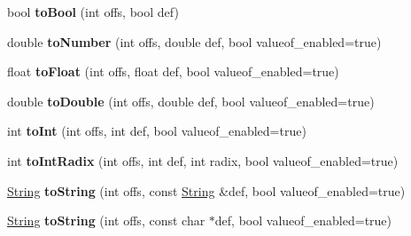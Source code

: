 \begin{DoxyCompactItemize}
\item 
bool {\bfseries to\+Bool} (int offs, bool def)\hypertarget{class_object_script_1_1_o_s_aebf8399e8f8802b67b8a27aca62fe905}{}\label{class_object_script_1_1_o_s_aebf8399e8f8802b67b8a27aca62fe905}

\item 
double {\bfseries to\+Number} (int offs, double def, bool valueof\+\_\+enabled=true)\hypertarget{class_object_script_1_1_o_s_abdc7b70c3bff83a69dbb933260be3419}{}\label{class_object_script_1_1_o_s_abdc7b70c3bff83a69dbb933260be3419}

\item 
float {\bfseries to\+Float} (int offs, float def, bool valueof\+\_\+enabled=true)\hypertarget{class_object_script_1_1_o_s_a5bd5708a0f57783edaffad0df7e1198b}{}\label{class_object_script_1_1_o_s_a5bd5708a0f57783edaffad0df7e1198b}

\item 
double {\bfseries to\+Double} (int offs, double def, bool valueof\+\_\+enabled=true)\hypertarget{class_object_script_1_1_o_s_a3bb36a4fd3474360c3e193ff31ce73a6}{}\label{class_object_script_1_1_o_s_a3bb36a4fd3474360c3e193ff31ce73a6}

\item 
int {\bfseries to\+Int} (int offs, int def, bool valueof\+\_\+enabled=true)\hypertarget{class_object_script_1_1_o_s_a79e6813c1bcb3b778a888510b77992e8}{}\label{class_object_script_1_1_o_s_a79e6813c1bcb3b778a888510b77992e8}

\item 
int {\bfseries to\+Int\+Radix} (int offs, int def, int radix, bool valueof\+\_\+enabled=true)\hypertarget{class_object_script_1_1_o_s_a9925918c4b584e3868eb18ef555474ac}{}\label{class_object_script_1_1_o_s_a9925918c4b584e3868eb18ef555474ac}

\item 
\hyperlink{class_object_script_1_1_o_s_1_1_string}{String} {\bfseries to\+String} (int offs, const \hyperlink{class_object_script_1_1_o_s_1_1_string}{String} \&def, bool valueof\+\_\+enabled=true)\hypertarget{class_object_script_1_1_o_s_a7fc7f4255712f8d95a4a9e3d1958875c}{}\label{class_object_script_1_1_o_s_a7fc7f4255712f8d95a4a9e3d1958875c}

\item 
\hyperlink{class_object_script_1_1_o_s_1_1_string}{String} {\bfseries to\+String} (int offs, const char $\ast$def, bool valueof\+\_\+enabled=true)\hypertarget{class_object_script_1_1_o_s_a9dbe2300509ff12737c082c5d4f56303}{}\label{class_object_script_1_1_o_s_a9dbe2300509ff12737c082c5d4f56303}


\end{DoxyCompactItemize}
